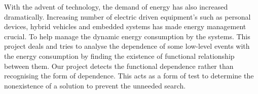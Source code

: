 With the advent of technology, the demand of energy has also increased dramatically. Increasing number of electric driven equipment’s such as personal devices, hybrid vehicles and embedded systems has made energy management crucial. To help manage the dynamic energy consumption by the systems. This project deals and tries to analyse the dependence of some low-level events with the energy consumption by finding the existence of functional relationship between them. Our project detects the functional dependence rather than recognising the form of dependence. This acts as a form of test to determine the nonexistence of a solution to prevent the unneeded search.